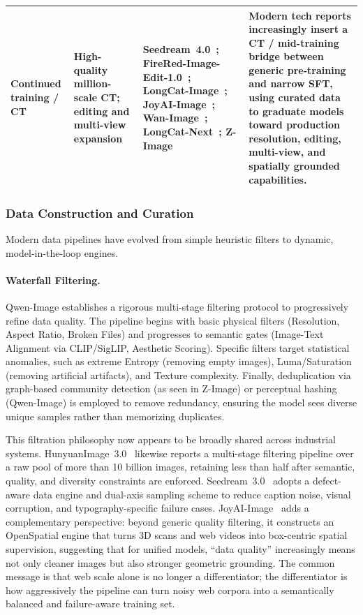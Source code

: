 \begin{table}[t]
\begin{tabularx}{\textwidth}{@{}>{\raggedright\arraybackslash}p{2.6cm}>{\raggedright\arraybackslash}p{3.0cm}>{\raggedright\arraybackslash}p{4.6cm}>{\raggedright\arraybackslash}X@{}}
\midrule
Continued training / CT & High-quality million-scale CT; editing and multi-view expansion & Seedream~4.0~\citep{seedream2025seedream}; FireRed-Image-Edit-1.0~\citep{team2026firered}; LongCat-Image~\citep{team2025longcat}; JoyAI-Image~\citep{jdjoyaiimage}; Wan-Image~\citep{mao2026wan}; LongCat-Next~\citep{team2026longcat}; Z-Image~\citep{cai2025z} & Modern tech reports increasingly insert a CT / mid-training bridge between generic pre-training and narrow SFT, using curated data to graduate models toward production resolution, editing, multi-view, and spatially grounded capabilities. \\
\bottomrule
\end{tabularx}
\end{table}

\subsubsection{Data Construction and Curation}
Modern data pipelines have evolved from simple heuristic filters to dynamic, model-in-the-loop engines.

\paragraph{Waterfall Filtering.}
Qwen-Image establishes a rigorous multi-stage filtering protocol to progressively refine data quality. The pipeline begins with basic physical filters (Resolution, Aspect Ratio, Broken Files) and progresses to semantic gates (Image-Text Alignment via CLIP/SigLIP, Aesthetic Scoring). Specific filters target statistical anomalies, such as extreme Entropy (removing empty images), Luma/Saturation (removing artificial artifacts), and Texture complexity. Finally, deduplication via graph-based community detection (as seen in Z-Image) or perceptual hashing (Qwen-Image) is employed to remove redundancy, ensuring the model sees diverse unique samples rather than memorizing duplicates.

This filtration philosophy now appears to be broadly shared across industrial systems. HunyuanImage~3.0~\citep{cao2025hunyuanimage} likewise reports a multi-stage filtering pipeline over a raw pool of more than 10 billion images, retaining less than half after semantic, quality, and diversity constraints are enforced. Seedream~3.0~\citep{gao2025seedream} adopts a defect-aware data engine and dual-axis sampling scheme to reduce caption noise, visual corruption, and typography-specific failure cases. JoyAI-Image~\citep{jdjoyaiimage} adds a complementary perspective: beyond generic quality filtering, it constructs an OpenSpatial engine that turns 3D scans and web videos into box-centric spatial supervision, suggesting that for unified models, ``data quality'' increasingly means not only cleaner images but also stronger geometric grounding. The common message is that web scale alone is no longer a differentiator; the differentiator is how aggressively the pipeline can turn noisy web corpora into a semantically balanced and failure-aware training set.

